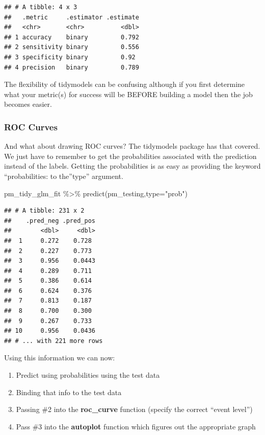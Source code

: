 \documentclass[
]{article}
\newenvironment{Shaded}{\begin{snugshade}}{\end{snugshade}}
\newcommand{\AttributeTok}[1]{\textcolor[rgb]{0.77,0.63,0.00}{#1}}
\newcommand{\FunctionTok}[1]{\textcolor[rgb]{0.00,0.00,0.00}{#1}}
\newcommand{\NormalTok}[1]{#1}
\newcommand{\SpecialCharTok}[1]{\textcolor[rgb]{0.00,0.00,0.00}{#1}}
\newcommand{\StringTok}[1]{\textcolor[rgb]{0.31,0.60,0.02}{#1}}
\providecommand{\tightlist}{%
  \setlength{\itemsep}{0pt}\setlength{\parskip}{0pt}}
\begin{document}
\begin{verbatim}
## # A tibble: 4 x 3
##   .metric     .estimator .estimate
##   <chr>       <chr>          <dbl>
## 1 accuracy    binary         0.792
## 2 sensitivity binary         0.556
## 3 specificity binary         0.92 
## 4 precision   binary         0.789
\end{verbatim}

The flexibility of tidymodels can be confusing although if you first
determine what your metric(s) for success will be BEFORE building a
model then the job becomes easier.

\hypertarget{roc-curves}{%
\subsubsection{ROC Curves}\label{roc-curves}}

And what about drawing ROC curves? The tidymodels package has that
covered. We just have to remember to get the probabilities associated
with the prediction instead of the labels. Getting the probabilities is
as easy as providing the keyword ``probabilities: to the''type''
argument.

\begin{Shaded}
\begin{Highlighting}[]
\NormalTok{pm\_tidy\_glm\_fit }\SpecialCharTok{\%\textgreater{}\%}
  \FunctionTok{predict}\NormalTok{(pm\_testing,}\AttributeTok{type=}\StringTok{"prob"}\NormalTok{)}
\end{Highlighting}
\end{Shaded}

\begin{verbatim}
## # A tibble: 231 x 2
##    .pred_neg .pred_pos
##        <dbl>     <dbl>
##  1     0.272    0.728 
##  2     0.227    0.773 
##  3     0.956    0.0443
##  4     0.289    0.711 
##  5     0.386    0.614 
##  6     0.624    0.376 
##  7     0.813    0.187 
##  8     0.700    0.300 
##  9     0.267    0.733 
## 10     0.956    0.0436
## # ... with 221 more rows
\end{verbatim}

Using this information we can now:

\begin{enumerate}
\def\labelenumi{\arabic{enumi})}
\tightlist
\item
  Predict using probabilities using the test data
\item
  Binding that info to the test data
\item
  Passing \#2 into the \textbf{roc\_curve} function (specify the correct
  ``event level'')
\item
  Pass \#3 into the \textbf{autoplot} function which figures out the
  appropriate graph
\end{enumerate}
\end{document}
